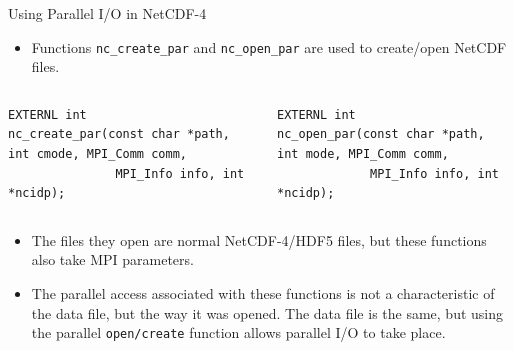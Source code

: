 \documentclass[compress,11pt,xcolor=svgnames,aspectratio=169]{beamer}
\begin{document}
\begin{frame}[fragile]{Using Parallel I/O in NetCDF-4}

\begin{itemize}

  \item Functions \verb|nc_create_par| and \verb|nc_open_par| are used to create/open NetCDF files.

\end{itemize}

\vspace*{-0.3cm}

\begin{columns}
\begin{column}{0.45\textwidth}
\begin{block}{}
\vspace*{-0.3cm}
{ \tiny
\begin{verbatim}
EXTERNL int
nc_create_par(const char *path, int cmode, MPI_Comm comm,
               MPI_Info info, int *ncidp);
\end{verbatim}
}
\vspace*{-0.3cm}
\end{block}
\end{column}

\begin{column}{0.45\textwidth}
\begin{block}{}
\vspace*{-0.3cm}
{ \tiny
\begin{verbatim}
EXTERNL int
nc_open_par(const char *path, int mode, MPI_Comm comm,
             MPI_Info info, int *ncidp);
\end{verbatim}
}
\vspace*{-0.3cm}
\end{block}
\end{column}
\end{columns}

\vspace*{0.3cm}

  \begin{itemize}
  \setlength\itemsep{0.3cm}

  \item The files they open are normal NetCDF-4/HDF5 files, but these functions also take MPI parameters.

  \item The parallel access associated with these functions is not a characteristic of the data file, but the way it was opened. The data file is the same, but using the parallel \verb|open/create| function allows parallel I/O to take place.

\end{itemize}

\end{frame}
\end{document}
